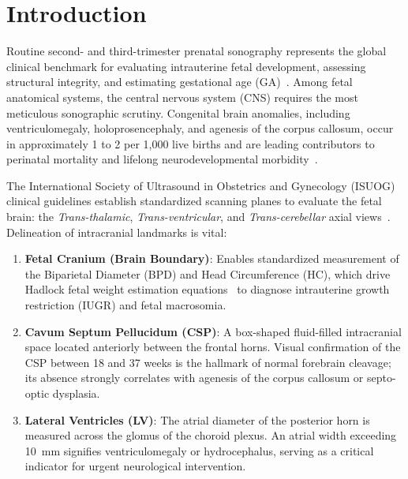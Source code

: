 \documentclass[conference]{IEEEtran}
\begin{document}
\section{Introduction}
\label{sec:intro}
Routine second- and third-trimester prenatal sonography represents the global clinical benchmark for evaluating intrauterine fetal development, assessing structural integrity, and estimating gestational age (GA)~\cite{salomon2011practice}. Among fetal anatomical systems, the central nervous system (CNS) requires the most meticulous sonographic scrutiny. Congenital brain anomalies, including ventriculomegaly, holoprosencephaly, and agenesis of the corpus callosum, occur in approximately 1 to 2 per 1,000 live births and are leading contributors to perinatal mortality and lifelong neurodevelopmental morbidity~\cite{salomon2011practice}.

The International Society of Ultrasound in Obstetrics and Gynecology (ISUOG) clinical guidelines establish standardized scanning planes to evaluate the fetal brain: the \textit{Trans-thalamic}, \textit{Trans-ventricular}, and \textit{Trans-cerebellar} axial views~\cite{salomon2011practice}. Delineation of intracranial landmarks is vital:
\begin{enumerate}
    \item \textbf{Fetal Cranium (Brain Boundary)}: Enables standardized measurement of the Biparietal Diameter (BPD) and Head Circumference (HC), which drive Hadlock fetal weight estimation equations~\cite{hadlock1984estimating} to diagnose intrauterine growth restriction (IUGR) and fetal macrosomia.
    \item \textbf{Cavum Septum Pellucidum (CSP)}: A box-shaped fluid-filled intracranial space located anteriorly between the frontal horns. Visual confirmation of the CSP between 18 and 37 weeks is the hallmark of normal forebrain cleavage; its absence strongly correlates with agenesis of the corpus callosum or septo-optic dysplasia.
    \item \textbf{Lateral Ventricles (LV)}: The atrial diameter of the posterior horn is measured across the glomus of the choroid plexus. An atrial width exceeding 10~mm signifies ventriculomegaly or hydrocephalus, serving as a critical indicator for urgent neurological intervention.
\end{enumerate}
\end{document}
